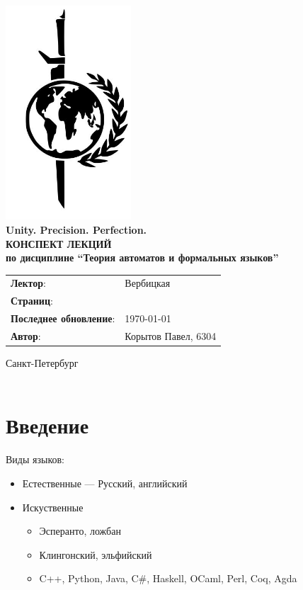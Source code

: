 \documentclass[a4paper, 14pt]{extarticle}
\begin{document}
\begin{titlepage}
    {\centering
        {\bfseries
            \includegraphics[height=8cm]{logo.jpeg}\\
            Unity. Precision. Perfection.\\
            \vspace{3.5cm}
            \uppercase{Конспект лекций} \\
            по дисциплине \enquote{Теория автоматов и формальных языков}\\
        }
        \vspace{\fill}
    }
    \begin{tabular}{l l}
        \textbf{Лектор}: & Вербицкая\\
        \textbf{Страниц}: &\pageref{LastPage}\\
        \textbf{Последнее обновление}: & \today{}\\ 
        \textbf{Автор}: & Корытов Павел, 6304\\
    \end{tabular}

    \vspace{2cm}
    {\centering
        Санкт-Петербург \\
        \the\year\\
    }
\end{titlepage}

\tableofcontents
\newpage
\section{Введение}
Виды языков:
\begin{itemize}
    \item Естественные --- Русский, английский
    \item Искуственные
    \begin{itemize}
        \item Эсперанто, ложбан
        \item Клингонский, эльфийский
        \item C++, Python, Java, C\#, Haskell, OCaml, Perl, Coq, Agda
    \end{itemize}
\end{itemize}
\end{document}

